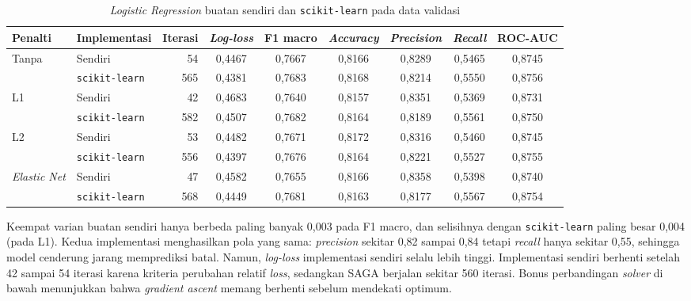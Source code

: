 \begin{table}[H]
\centering
\footnotesize
\caption{\textit{Logistic Regression} buatan sendiri dan \texttt{scikit-learn} pada data validasi}
\label{tab:logreg}
\setlength{\tabcolsep}{4pt}
\begin{tabular}{@{}llrcccccc@{}}
\toprule
Penalti & Implementasi & Iterasi & \textit{Log-loss} & F1 macro & \textit{Accuracy} & \textit{Precision} & \textit{Recall} & ROC-AUC \\
\midrule
Tanpa & Sendiri & 54 & 0,4467 & 0,7667 & 0,8166 & 0,8289 & 0,5465 & 0,8745 \\
 & \texttt{scikit-learn} & 565 & 0,4381 & 0,7683 & 0,8168 & 0,8214 & 0,5550 & 0,8756 \\
L1 & Sendiri & 42 & 0,4683 & 0,7640 & 0,8157 & 0,8351 & 0,5369 & 0,8731 \\
 & \texttt{scikit-learn} & 582 & 0,4507 & 0,7682 & 0,8164 & 0,8189 & 0,5561 & 0,8750 \\
L2 & Sendiri & 53 & 0,4482 & 0,7671 & 0,8172 & 0,8316 & 0,5460 & 0,8745 \\
 & \texttt{scikit-learn} & 556 & 0,4397 & 0,7676 & 0,8164 & 0,8221 & 0,5527 & 0,8755 \\
\textit{Elastic Net} & Sendiri & 47 & 0,4582 & 0,7655 & 0,8166 & 0,8358 & 0,5398 & 0,8740 \\
 & \texttt{scikit-learn} & 568 & 0,4449 & 0,7681 & 0,8163 & 0,8177 & 0,5567 & 0,8754 \\
\bottomrule
\end{tabular}
\end{table}

Keempat varian buatan sendiri hanya berbeda paling banyak 0,003 pada F1
macro, dan selisihnya dengan \texttt{scikit-learn} paling besar 0,004 (pada
L1). Kedua implementasi menghasilkan pola yang sama: \textit{precision}
sekitar 0,82 sampai 0,84 tetapi \textit{recall} hanya sekitar 0,55, sehingga
model cenderung jarang memprediksi batal. Namun, \textit{log-loss}
implementasi sendiri selalu lebih tinggi. Implementasi sendiri berhenti
setelah 42 sampai 54 iterasi karena kriteria perubahan relatif
\textit{loss}, sedangkan SAGA berjalan sekitar 560 iterasi. Bonus
perbandingan \textit{solver} di bawah menunjukkan bahwa
\textit{gradient ascent} memang berhenti sebelum mendekati optimum.


